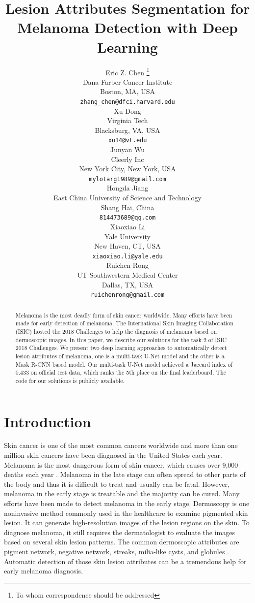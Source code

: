 \documentclass{article}
\title{Lesion Attributes Segmentation for Melanoma Detection with Deep Learning}
\author{
  Eric Z. Chen \thanks{To whom correspondence should be addressed}\\
  Dana-Farber Cancer Institute\\
  Boston, MA, USA \\
  \texttt{zhang\_chen@dfci.harvard.edu} \\
  \And
  Xu Dong \\
  Virginia Tech \\
  Blacksburg, VA, USA \\
  \texttt{xu14@vt.edu} \\
  \AND
  Junyan Wu \\
  Cleerly Inc \\
  New York City, New York, USA \\
  \texttt{mylotarg1989@gmail.com} \\
  \And
  Hongda Jiang \\
  East China University of Science and Technology \\
  Shang Hai, China \\
  \texttt{814473689@qq.com} \\
  \And
  Xiaoxiao Li \\
  Yale University \\
  New Haven, CT, USA \\
  \texttt{xiaoxiao.li@yale.edu} \\
  \And
  Ruichen Rong \\
  UT Southwestern Medical Center \\
  Dallas, TX, USA \\
  \texttt{ruichenrong@gmail.com} \\
}
\begin{document}


\maketitle

\begin{abstract}
Melanoma is the most deadly form of skin cancer worldwide. Many efforts have been made for early detection of melanoma. The International Skin Imaging Collaboration (ISIC) hosted the 2018 Challenges to help the diagnosis of melanoma based on dermoscopic images. In this paper, we describe our solutions for the task 2 of ISIC 2018 Challenges. We present two deep learning approaches to automatically detect lesion attributes of melanoma, one is a multi-task U-Net model and the other is a Mask R-CNN based model. Our multi-task U-Net model achieved a Jaccard index of 0.433 on official test data, which ranks the 5th place on the final leaderboard. The code for our solutions is publicly available. 
\end{abstract}


\section{Introduction}



Skin cancer is one of the most common cancers worldwide and more than one million skin cancers have been diagnosed in the United States each year. Melanoma is the most dangerous form of skin cancer, which causes over 9,000 deaths each year \citep{ucsw2013united}. Melanoma in the late stage can often spread to other parts of the body and thus it is difficult to treat and usually can be fatal. However, melanoma in the early stage is treatable and the majority can be cured. Many efforts have been made to detect melanoma in the early stage. Dermoscopy is one noninvasive method commonly used in the healthcare to examine pigmented skin lesion. It can generate high-resolution images of the lesion regions on the skin. To diagnose melanoma, it still requires the dermatologist to evaluate the images based on several skin lesion patterns. The common dermoscopic attributes are pigment network, negative network, streaks, milia-like cysts, and globules \citep{mishra2016overview}. Automatic detection of those skin lesion attributes can be a tremendous help for early melanoma diagnosis. 
\end{document}

